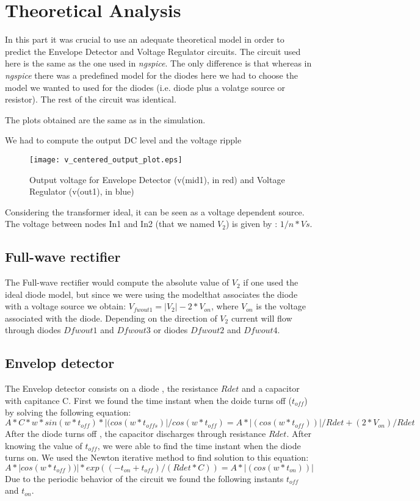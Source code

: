 \section{Theoretical Analysis}
\label{sec:analysis}



In this part it was crucial to use an adequate theoretical model in order to predict the Envelope Detector and Voltage Regulator circuits. The circuit used here is the same as the one used in \textit{ngspice}. The only difference is that whereas in \textit{ngspice} there was a predefined model for the diodes here we had to choose the model we wanted to used for the diodes (i.e. diode plus a volatge source or resistor). The rest of the circuit was identical.

The plots obtained are the same as in the simulation.

We had to compute the output DC level and the voltage ripple


\begin{figure}[H] \centering
\texttt{[image: v\_centered\_output\_plot.eps]}
\caption{Output voltage for Envelope Detector (v(mid1), in red) and Voltage Regulator (v(out1), in blue)}
\label{fig:phase_sim}
\end{figure}

Considering the transformer ideal, it can be seen as a voltage dependent source. The voltage between nodes In1 and In2 (that we named $V_2$) is given by : $1/n * Vs$.

\subsection{Full-wave rectifier}
The Full-wave rectifier would  compute the  absolute value of $V_2$ if one used the ideal diode model, but since we were using the modelthat associates the diode with a voltage source we obtain: $V_{fwout1} = |V_2|- 2*V_{on}$, where $V_{on}$ is the voltage associated with the diode. Depending on the direction of $V_2$ current will flow through diodes $Dfwout1$ and $Dfwout3$ or diodes $Dfwout2$ and $Dfwout4$.

\subsection{Envelop detector}
The Envelop detector consists on a diode , the resistance $Rdet$ and a capacitor with capitance C. First we found the time instant when the doide turns off ($t_{off}$) by solving the following equation:
\begin{equation}
  A*C*w*sin(w*t_{off})*|(cos(w*t_{offs})|/cos(w*t_{off}) =  A*|(cos(w*t_{off}))|/Rdet +(2*V_{on})/Rdet
\end{equation}
After the diode turns off , the capacitor discharges through resistance $Rdet$.
After knowing the value of $t_{off}$, we were able to find the time instant when  the diode turns on. We used the Newton iterative method to find solution to this equation:
\begin{equation}
   A*|cos(w*t_{off}))|*exp((-t_{on}+t_{off})/(Rdet*C))=  A*|(cos(w*t_{on}))|
\end{equation}
Due to the periodic behavior of the circuit we found the following instants $t_{off}$ and $t_{on}$.  

